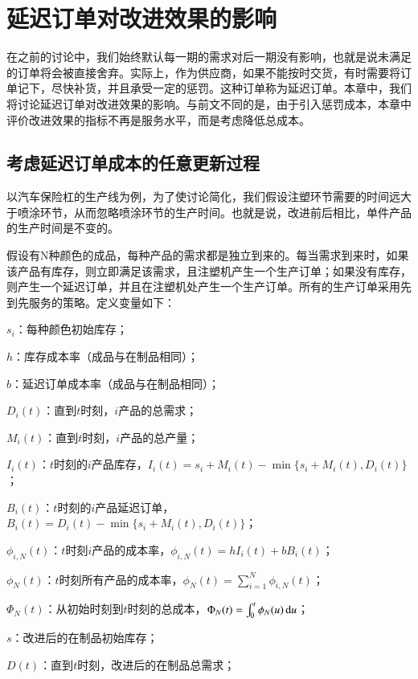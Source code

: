 
\chapter{延迟订单对改进效果的影响}

在之前的讨论中，我们始终默认每一期的需求对后一期没有影响，也就是说未满足的订单将会被直接舍弃。实际上，作为供应商，如果不能按时交货，有时需要将订单记下，尽快补货，并且承受一定的惩罚。这种订单称为延迟订单。本章中，我们将讨论延迟订单对改进效果的影响。与前文不同的是，由于引入惩罚成本，本章中评价改进效果的指标不再是服务水平，而是考虑降低总成本。




\section{考虑延迟订单成本的任意更新过程}

以汽车保险杠的生产线为例，为了使讨论简化，我们假设注塑环节需要的时间远大于喷涂环节，从而忽略喷涂环节的生产时间。也就是说，改进前后相比，单件产品的生产时间是不变的。

假设有N种颜色的成品，每种产品的需求都是独立到来的。每当需求到来时，如果该产品有库存，则立即满足该需求，且注塑机产生一个生产订单；如果没有库存，则产生一个延迟订单，并且在注塑机处产生一个生产订单。所有的生产订单采用先到先服务的策略。定义变量如下：

$s_i$：每种颜色初始库存；

$h$：库存成本率（成品与在制品相同）；

$b$：延迟订单成本率（成品与在制品相同）；

$D_i(t)$：直到$t$时刻，$i$产品的总需求；

$M_i(t)$：直到$t$时刻，$i$产品的总产量；

$I_i(t)$：$t$时刻的$i$产品库存，$I_i(t)=s_i+M_i(t)-\min\{s_i+M_i(t),D_i(t)\}$；

$B_i(t)$：$t$时刻的$i$产品延迟订单，$B_i(t)=D_i(t)-\min\{s_i+M_i(t),D_i(t)\}$；

$\phi_{i,N}(t)$：$t$时刻$i$产品的成本率，$\phi_{i,N}(t)=hI_i(t)+bB_i(t)$；

$\phi_N(t)$：$t$时刻所有产品的成本率，$\phi_N(t)=\sum_{i=1}^N\phi_{i,N}(t)$；

$\Phi_N(t)$：从初始时刻到$t$时刻的总成本，$\Phi_N(t)=\int_0^t\phi_N(u)\operatorname{d\!} u$；

$s$：改进后的在制品初始库存；

$D(t)$：直到$t$时刻，改进后的在制品总需求；

